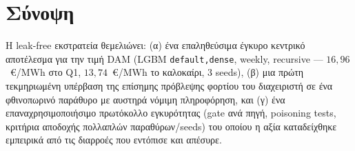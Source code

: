 \section{Σύνοψη}
\label{sec:lf_summary}

Η leak-free εκστρατεία θεμελιώνει: (α) ένα επαληθεύσιμα έγκυρο κεντρικό
αποτέλεσμα για την τιμή DAM (LGBM \texttt{default,dense}, weekly, recursive ---
$16{,}96$~€/MWh στο Q1, $13{,}74$~€/MWh το καλοκαίρι, 3 seeds), (β) μια πρώτη
τεκμηριωμένη υπέρβαση της επίσημης πρόβλεψης φορτίου του διαχειριστή σε ένα
φθινοπωρινό παράθυρο με αυστηρά νόμιμη πληροφόρηση, και (γ) ένα επαναχρησιμοποιήσιμο
πρωτόκολλο εγκυρότητας (gate ανά πηγή, poisoning tests, κριτήρια αποδοχής
πολλαπλών παραθύρων/seeds) του οποίου η αξία καταδείχθηκε εμπειρικά από τις
διαρροές που εντόπισε και απέσυρε.
